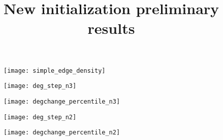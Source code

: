 \documentclass[11pt]{article}
\begin{document}
\title{\vspace{-20mm}New initialization preliminary results}
\author{}
\date{}
\maketitle

\centering
\begin{figure}[h!]
  \vspace{-15mm}
  \texttt{[image: simple\_edge\_density]}
\end{figure}

\centering
\begin{figure}[h!]
  \vspace{-5mm}
  \texttt{[image: deg\_step\_n3]}
\end{figure}

\centering
\begin{figure}[h!]
  \texttt{[image: degchange\_percentile\_n3]}
\end{figure}


\clearpage


\centering
\begin{figure}[h!]
  \texttt{[image: deg\_step\_n2]}
\end{figure}

\centering
\begin{figure}[h!]
  \texttt{[image: degchange\_percentile\_n2]}
\end{figure}
\end{document}
